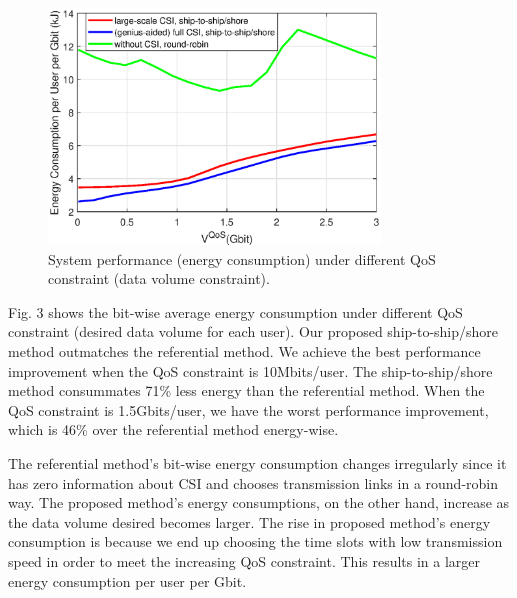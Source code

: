 \documentclass[journal]{IEEEtran}
\begin{document}
 \begin{figure} [htb]
 \begin{center}
 \includegraphics*[width=8.8cm]{Cqos.eps}
 \end{center}
 \vspace*{-4mm} 
 \caption{System performance (energy consumption) under different QoS constraint (data volume constraint).}\label{fig:3}
 \vspace*{-2mm} 
 \end{figure}
 
 
 
 Fig. 3 shows the bit-wise average energy consumption under different QoS constraint (desired data volume for each user).
 Our proposed ship-to-ship/shore method outmatches the referential method. We achieve the best performance improvement when the QoS constraint is 10Mbits/user. The ship-to-ship/shore method consummates 71\% less energy than the referential method. When the QoS constraint is 1.5Gbits/user, we have the worst performance improvement, which is 46\% over the referential method energy-wise.
 
 The referential method's bit-wise energy consumption changes irregularly since it has zero information about CSI and chooses transmission links in a round-robin way. The proposed method's energy consumptions, on the other hand, increase as the data volume desired becomes larger. The rise in proposed method's energy consumption is because we end up choosing the time slots with low transmission speed in order to meet the increasing QoS constraint. This results in a larger energy consumption per user per Gbit. 
 
 
 
\end{document}
